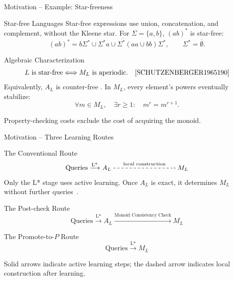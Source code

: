 \documentclass{beamer}
\begin{document}
\begin{frame}{Motivation -- Example: Star-freeness}
    \begin{block}{Star-free Languages}
        Star-free expressions use union, concatenation, and complement,
        without the Kleene star. For $\Sigma=\{a,b\}$, $(ab)^*$ is star-free:
        $$
        (ab)^*=
        \overline{
        b\Sigma^*\cup\Sigma^*a
        \cup\Sigma^*(aa\cup bb)\Sigma^*
        },
        \qquad \Sigma^*=\overline{\emptyset}.
        $$
    \end{block}
    \begin{block}{Algebraic Characterization}
        $$
        L\text{ is star-free}
        \Longleftrightarrow M_L\text{ is aperiodic}.
        \quad \cite{SCHUTZENBERGER1965190}
        $$
        Equivalently, $A_L$ is counter-free \cite{thomas2005applied}.
        In $M_L$, every element's powers eventually stabilize:
        $$
        \forall m\in M_L,\quad \exists r\geq 1:\quad m^r=m^{r+1}.
        $$
    \end{block}
    {\small Property-checking costs exclude the cost of acquiring the monoid.}
\end{frame}

\begin{frame}{Motivation -- Three Learning Routes}
    \begin{block}{The Conventional Route}
        \[
        \text{Queries}\xrightarrow{\text{L*}} A_L
        \mathrel{\tikz[baseline=-0.6ex]{
            \draw[dashed,->,line width=0.45pt] (0,0)--(3.2,0);
            \node[above=4pt,inner sep=0pt,font=\scriptsize] at (1.6,0)
                {local construction};
        }} M_L
        \]
        {\small Only the L* stage uses active learning. Once $A_L$ is exact,
        it determines $M_L$ without further queries~\cite{froidure1997algorithms}.}
    \end{block}

    \begin{block}{The Post-check Route}
        \[
        \text{Queries}\xrightarrow{\text{L*}} A_L
        \xrightarrow{\text{Monoid Consistency Check}} M_L
        \]
    \end{block}

    \begin{block}{The Promote-to-$P$ Route}
        \[
        \text{Queries}\xrightarrow{\text{L*}} M_L
        \]
    \end{block}

    {\footnotesize Solid arrows indicate active learning steps; the dashed arrow
    indicates local construction after learning.}
\end{frame}
\end{document}
